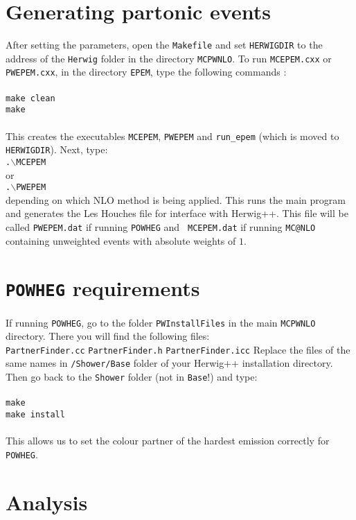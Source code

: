 \documentclass[12pt,a4paper,oneside]{article}
\begin{document}
\section{Generating partonic events}
After setting the parameters, open the {\tt Makefile} and set {\tt HERWIGDIR} to the address of the {\tt Herwig} folder
in the directory {\tt MCPWNLO}. 
To run {\tt MCEPEM.cxx} or {\tt PWEPEM.cxx}, in the directory {\tt EPEM}, type the following commands :\\
\\
{\tt make clean} \\
{\tt make} \\
\\
This creates the executables {\tt MCEPEM}, {\tt PWEPEM} and {\tt run\_epem} (which is moved to {\tt
  HERWIGDIR}). Next, type: \\
{\tt .$\backslash$MCEPEM} \\ 
or\\
{\tt .$\backslash$PWEPEM} \\ 
depending on which NLO method is being applied.
This runs the main program and generates the Les Houches file for interface with \textsf{Herwig++}. This file will be called {\tt PWEPEM.dat} if running {\tt POWHEG} and {\tt
  MCEPEM.dat} if running {\tt MC@NLO} containing unweighted events with absolute weights
of $1$.
\section{{\tt POWHEG} requirements}
If running {\tt POWHEG}, go to the folder {\tt PWInstallFiles} in the main {\tt MCPWNLO}
directory. There you will find the following files:\\
{\tt PartnerFinder.cc}  {\tt PartnerFinder.h}  {\tt PartnerFinder.icc}
Replace the files of the same names in {\tt /Shower/Base} folder of your \textsf{Herwig++}
installation directory. Then go back to the {\tt Shower} folder (not in {\tt Base}!) and type: \\
\\
{\tt make} \\
{\tt make install} \\
\\
This allows us to set the colour partner of the hardest emission correctly for {\tt
  POWHEG}.
\section{Analysis} 
\end{document}
